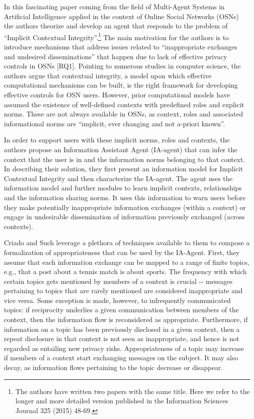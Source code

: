 \documentclass[../thesis.tex]{subfiles}
\begin{document}
In this fascinating paper coming from the field of Multi-Agent Systems
in Artificial Intelligence applied in the context of Online Social
Networks (OSNs) the authors theorize and develop an agent that responds
to the problem of ``Implicit Contextual
Integrity''.\footnote{ The authors have written two
papers with the same title. Here we refer to the longer and more
detailed version published in the Information Sciences Journal 325
(2015) 48-69. } The main motivation for the authors is to introduce
mechanisms that address issues related to
``inappropriate exchanges and undesired
disseminations'' that happen due to lack of effective
privacy controls in OSNs [RQ1]. Pointing to numerous studies in
computer science, the authors argue that contextual integrity, a model
upon which effective computational mechanisms can be built, is the
right framework for developing effective controls for OSN users.
However, prior computational models have assumed the existence of
well-defined contexts with predefined roles and explicit norms. These
are not always available in OSNs, as context, roles and associated
informational norms are ``implicit, ever changing and
not a-priori known''.

In order to support users with these implicit norms, roles and contexts,
the authors propose an Information Assistant Agent (IA-agent) that can
infer the context that the user is in and the information norms
belonging to that context. In describing their solution, they first
present an information model for Implicit Contextual Integrity and then
characterize the IA-agent. The agent uses the information model and
further modules to learn implicit contexts, relationships and the
information sharing norms. It uses this information to warn users
before they make potentially inappropriate information exchanges
(within a context) or engage in undesirable dissemination of
information previously exchanged (across contexts). 

Criado and Such leverage a plethora of techniques available to them to
compose a formalization of appropriateness that can be used by the
IA-Agent. First, they assume that each information exchange can be
mapped to a range of finite topics, e.g., that a post about a tennis
match is about sports. The frequency with which certain topics gets
mentioned by members of a context is crucial -{}- messages pertaining
to topics that are rarely mentioned are considered inappropriate and
vice versa. Some exception is made, however, to infrequently
communicated topics: if reciprocity underlies a given communication
between members of the context, then the information flow is
reconsidered as appropriate. Furthermore, if information on a topic has
been previously disclosed in a given context, then a repeat disclosure
in that context is not seen as inappropriate, and hence is not regarded
as entailing new privacy risks. Appropriateness of a topic may increase
if members of a context start exchanging messages on the subject. It
may also decay, as information flows pertaining to the topic decrease
or disappear. 
\end{document}
